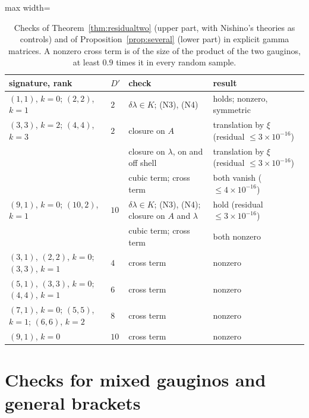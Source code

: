 \begin{table}[htbp]
\centering
\begin{adjustbox}{max width=\linewidth}\begin{tabular}{@{}llll@{}}
\toprule
signature, rank & $D'$ & check & result\\
\midrule
$(1,1)$, $k=0$; $(2,2)$, $k=1$ & $2$ & $\delta\lambda\in K$; (N3), (N4) & holds; nonzero, symmetric\\
$(3,3)$, $k=2$; $(4,4)$, $k=3$ & $2$ & closure on $A$ & translation by $\xi$ (residual $\le3\times10^{-16}$)\\
 & & closure on $\lambda$, on and off shell & translation by $\xi$ (residual $\le3\times10^{-16}$)\\
 & & cubic term; cross term & both vanish ($\le4\times10^{-16}$)\\
\midrule
$(9,1)$, $k=0$; $(10,2)$, $k=1$ & $10$ & $\delta\lambda\in K$; (N3), (N4); closure on $A$ and $\lambda$ & hold (residual $\le3\times10^{-16}$)\\
 & & cubic term; cross term & both nonzero\\
\midrule
$(3,1)$, $(2,2)$, $k=0$; $(3,3)$, $k=1$ & $4$ & cross term & nonzero\\
$(5,1)$, $(3,3)$, $k=0$; $(4,4)$, $k=1$ & $6$ & cross term & nonzero\\
$(7,1)$, $k=0$; $(5,5)$, $k=1$; $(6,6)$, $k=2$ & $8$ & cross term & nonzero\\
$(9,1)$, $k=0$ & $10$ & cross term & nonzero\\
\bottomrule
\end{tabular}\end{adjustbox}
\caption{Checks of Theorem~\ref{thm:residualtwo} (upper part, with Nishino's theories as controls) and of Proposition~\ref{prop:several} (lower part) in explicit gamma matrices. A nonzero cross term is of the size of the product of the two gauginos, at least $0.9$ times it in every random sample.}
\label{tab:residualtwo}
\end{table}
\FloatBarrier

\section{Checks for mixed gauginos and general brackets}
\label{app:mixed}

